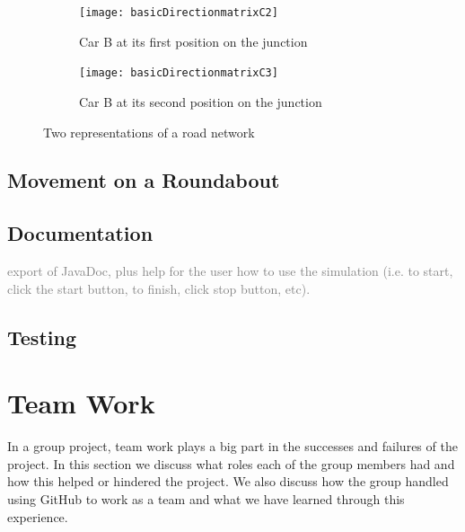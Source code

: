 \documentclass{article}
\begin{document}
	\begin{figure}[H]
		\centering
		
		\begin{subfigure}{0.45\textwidth}
			\centering
			\texttt{[image: basicDirectionmatrixC2]}
			\caption{Car B at its first position on the junction}
			\label{FirstMove}
		\end{subfigure}
		\qquad
		\begin{subfigure}{0.45\textwidth}
			\centering
			\texttt{[image: basicDirectionmatrixC3]}
			\caption{Car B at its second position on the junction}
			\label{SecondMove}
		\end{subfigure}
		\caption{Two representations of a road network}
		\label{Car B in a junction}
	\end{figure}


\subsection{Movement on a Roundabout}\label{movementOnARoundabout}
	
	\subsection{Documentation}
	\textcolor{gray}{export of JavaDoc, plus help for the user how to use the simulation (i.e. to start, click the start button, to finish, click stop button, etc).}
	
	
	\subsection{Testing}
  




	
	\section{Team Work}
	In a group project, team work plays a big part in the successes and failures of the project. In this section we discuss what roles each of the group members had and how this helped or hindered the project. We also discuss how the group handled using GitHub to work as a team and what we have learned through this experience. 
	
\end{document}
